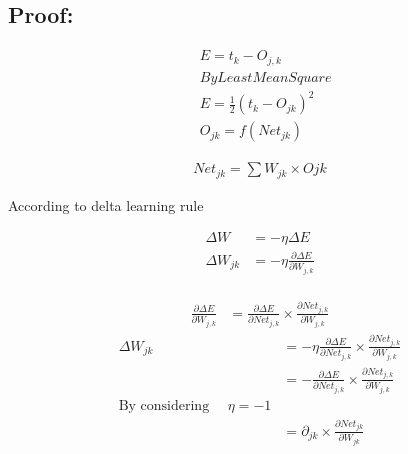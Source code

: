 \documentclass[12pt, right open]{memoir}
\begin{document}
\subsection{Proof:}

\begin{align*}
&E = t_k - O_{j,k} \\
&By Least Mean Square \\
&E = \frac{1}{2}(t_k-O_{jk})^2 \\
&O_{jk} = f(Net_{jk})
\end{align*}

\begin{align}
Net_{jk} = \sum W_{jk} \times O{jk}
\end{align}

According to delta learning rule

\begin{align*}
\Delta W &= - \eta \Delta E \\
\Delta W_{jk} &= - \eta \frac{\partial \Delta E}{\partial W_{j,k}} \\
\end{align*}

\begin{align}
\frac{\partial \Delta E}{\partial W_{j,k}} &= \frac{\partial \Delta E}{\partial Net_{j,k}} \times
                                             \frac{\partial Net_{j,k}}{\partial W_{j,k}} 
\end{align}  
\begin{align*}                                        
\Delta W_{jk} &= - \eta \frac{\partial \Delta E}{\partial Net_{j,k}} \times
                   \frac{\partial Net_{j,k}}{\partial W_{j,k}} \\
              &= - \frac{\partial \Delta E}{\partial Net_{j,k}} \times
                   \frac{\partial Net_{j,k}}{\partial W_{j,k}} \\
\text{By considering~~~~}  \eta = -1 \\
		      &=  \partial_{jk} \times
                  \frac{\partial Net_{jk}}{\partial W_{jk}}
\end{align*} 
\end{document}
